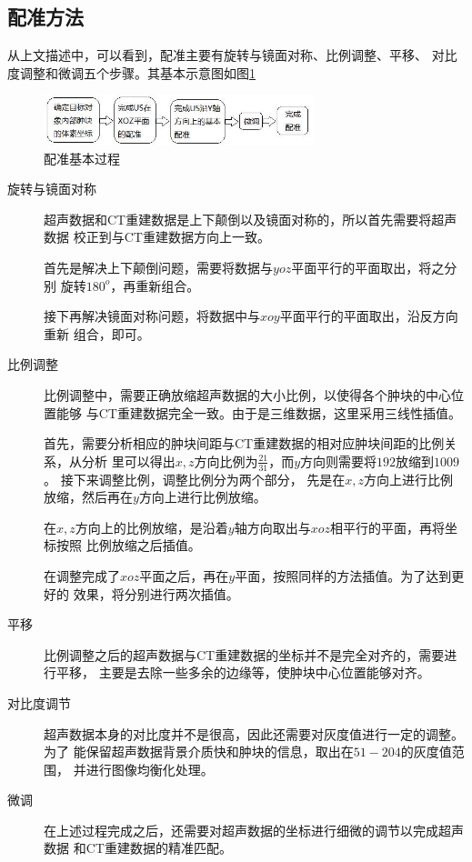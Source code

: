 \subsection{配准方法}
从上文描述中，可以看到，配准主要有旋转与镜面对称、比例调整、平移、
对比度调整和微调五个步骤。其基本示意图如图\ref{fig:matchmethod}
\begin{figure}[!ht]
\center
\includegraphics[width=0.7\textwidth]{figure/match/method.jpg}
\caption{配准基本过程}
\label{fig:matchmethod}
\end{figure}
\begin{description}
\item[旋转与镜面对称]
超声数据和CT重建数据是上下颠倒以及镜面对称的，所以首先需要将超声数据
校正到与CT重建数据方向上一致。

首先是解决上下颠倒问题，需要将数据与$yoz$平面平行的平面取出，将之分别
旋转$180^o$，再重新组合。

接下再解决镜面对称问题，将数据中与$xoy$平面平行的平面取出，沿反方向重新
组合，即可。

\item[比例调整]
比例调整中，需要正确放缩超声数据的大小比例，以使得各个肿块的中心位置能够
与CT重建数据完全一致。由于是三维数据，这里采用三线性插值。

首先，需要分析相应的肿块间距与CT重建数据的相对应肿块间距的比例关系，从分析
里可以得出$x,z$方向比例为$\tfrac{21}{31}$，而$y$方向则需要将$192$放缩到$1009$。
接下来调整比例，调整比例分为两个部分，
先是在$x,z$方向上进行比例放缩，然后再在$y$方向上进行比例放缩。

在$x,z$方向上的比例放缩，是沿着$y$轴方向取出与$xoz$相平行的平面，再将坐标按照
比例放缩之后插值。

在调整完成了$xoz$平面之后，再在$y$平面，按照同样的方法插值。为了达到更好的
效果，将分别进行两次插值。

\item[平移]
比例调整之后的超声数据与CT重建数据的坐标并不是完全对齐的，需要进行平移，
主要是去除一些多余的边缘等，使肿块中心位置能够对齐。

\item[对比度调节]
超声数据本身的对比度并不是很高，因此还需要对灰度值进行一定的调整。为了
能保留超声数据背景介质快和肿块的信息，取出在$51-204$的灰度值范围，
并进行图像均衡化处理。

\item[微调]
在上述过程完成之后，还需要对超声数据的坐标进行细微的调节以完成超声数据
和CT重建数据的精准匹配。
\end{description}

